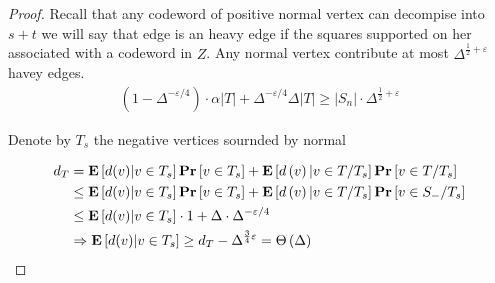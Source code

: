  \begin{proof}
   Recall that any codeword of positive normal vertex can decompise into $s + t$ we will say that edge is an heavy edge if the squares supported on her associated with a codeword in $Z$. Any normal vertex contribute at most $\Delta^{\frac{1}{2}+\varepsilon}$ havey edges. 
   \begin{equation*}
     \begin{split}
       \left( 1 - \Delta^{-\varepsilon/4} \right) \cdot \alpha |T| +  \Delta^{-\varepsilon/4}  \Delta |T| \ge |S_{n}| \cdot \Delta^{\frac{1}{2} + \varepsilon}
     \end{split}
   \end{equation*}
   
   Denote by $T_{s}$ the negative vertices sournded by normal  
  
   \begin{equation*}
     \begin{split}
       d_{T} &= \mathbf{E} \left[ { d(v) | v \in T_{s} } \right] \mathbf{Pr} \left[  v \in T_{s} \right] + \mathbf{E} \left[ {d\left( v \right) | v \in T / T_{s}} \right] \mathbf{Pr} \left[  v \in T / T_{s} \right] \\
       & \le \mathbf{E} \left[ { d(v) | v \in T_{s} } \right] \mathbf{Pr} \left[  v \in T_{s} \right] + \mathbf{E} \left[ {d\left( v \right) | v \in T / T_{s}} \right] \mathbf{Pr} \left[  v \in S_{-} / T_{s} \right] \\
       & \le \mathbf{E} \left[ { d(v) | v \in T_{s} } \right] \cdot 1   + \Delta \cdot  \Delta^{-\varepsilon/4} \\
       & \Rightarrow  \mathbf{E} \left[ { d(v) | v \in T_{s} } \right] \ge d_{T} - \Delta^{\frac{3}{4} \varepsilon} = \Theta\left( \Delta \right) 
     \end{split}
   \end{equation*}


 \end{proof}





